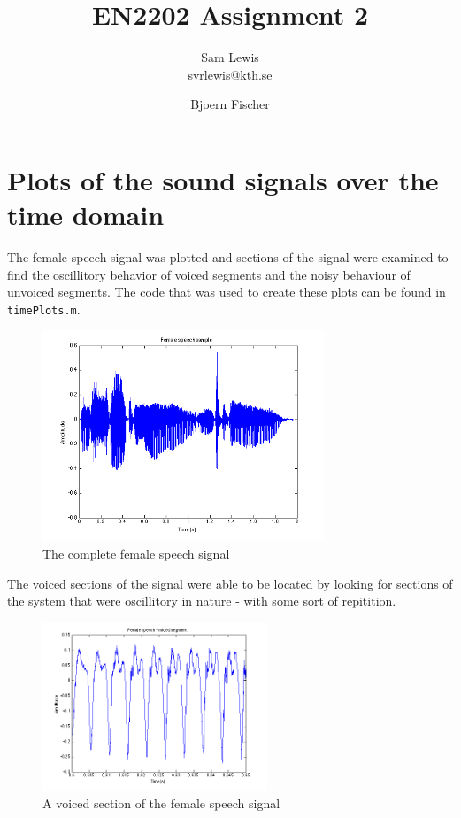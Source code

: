 \documentclass[11pt]{article}   %
\begin{document}
\setlength{\parindent}{0.00in}

\title{EN2202 Assignment 2}

\author{
 Sam Lewis\\
 svrlewis@kth.se
  \and
  Bjoern Fischer  
}
\date{} 
\maketitle
\linespread{1.5}

\section{Plots of the sound signals over the time domain}

The female speech signal was plotted and sections of the signal were examined to find the oscillitory behavior of voiced segments and the noisy behaviour of unvoiced segments. The code that was used to create these plots can be found in \texttt{timePlots.m}.

\begin{figure}[H]
\begin{center}
\leavevmode
\includegraphics[width=0.75\textwidth]{female.png}
\end{center}
\caption{The complete female speech signal}
\label{euler:1}
\end{figure}


\newpage
The voiced sections of the signal were able to be located by looking for sections of the system that were oscillitory in nature - with some sort of repitition.

\begin{figure}[H]
\begin{center}
\leavevmode
\includegraphics[width=0.6\textwidth]{voiced.png}
\end{center}
\caption{A voiced section of the female speech signal}
\label{euler:1}
\end{figure}
\end{document}
